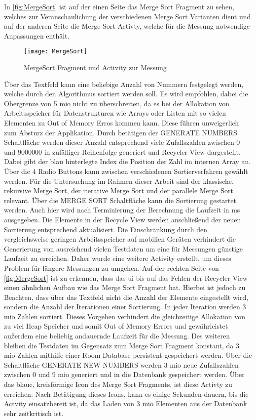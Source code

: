 In \autoref{fig:MergeSort} ist auf der einen Seite das Merge Sort Fragment zu sehen, welches zur Veranschaulichung der verschiedenen Merge Sort Varianten dient und auf der anderen Seite die Merge Sort Activty, welche für die Messung notwendige Anpassungen enthält. 
\begin{figure}[H]
\begin{center}
	\texttt{[image: MergeSort]}
	\caption{MergeSort Fragment und Activity zur Messung}
	\label{fig:MergeSort} 
\end{center}
\end{figure}
Über das Textfeld kann eine beliebige Anzahl von Nummern festgelegt werden, welche durch den Algorithmus sortiert werden soll. Es wird empfohlen, dabei die Obergrenze von 5 \ac{mio} nicht zu überschreiten, da es bei der Allokation von Arbeitsspeicher für Datenstrukturen wie Arrays oder Listen mit so vielen Elementen zu Out of Memory Erros kommen kann. Diese führen unweigerlich zum Absturz der Applikation. Durch betätigen der \glqq GENERATE NUMBERS\grqq{} Schaltfläche werden dieser Anzahl entsprechend viele Zufallszahlen zwischen 0 und 9000000 in zufälliger Reihenfolge generiert und Recycler View dargestellt. Dabei gibt der blau hinterlegte Index die Position der Zahl im internen Array an. Über die 4 Radio Buttons kann zwischen verschiedenen Sortierverfahren gewählt werden. Für die Untersuchung im Rahmen dieser Arbeit sind der klassische, rekursive Merge Sort, der iterative Merge Sort und der parallele Merge Sort relevant. Über die \glqq MERGE SORT\grqq{} Schaltfläche kann die Sortierung gestartet werden. Auch hier wird nach Terminierung der Berechnung die Laufzeit in \ac{ms} ausgegeben. Die Elemente in der Recycle View werden anschließend der neuen Sortierung entsprechend aktualisiert. Die Einschränkung durch den vergleichsweise geringen Arbeitsspeicher auf mobilien Geräten verhindert die Generierung von ausreichend vielen Testdaten um eine für Messungen günstige Laufzeit zu erreichen. Daher wurde eine weitere Activity erstellt, um dieses Problem für längere Messungen zu umgehen. Auf der rechten Seite von \autoref{fig:MergeSort} ist zu erkennen, dass das \ac{ui} bis auf das Fehlen der Recycler View einen ähnlichen Aufbau wie das Merge Sort Fragment hat. Hierbei ist jedoch zu Beachten, dass über das Textfeld nicht die Anzahl der Elemente eingestellt wird, sondern die Anzahl der Iterationen einer Sortierung. In jeder Iteration werden 3 \ac{mio} Zahlen sortiert. Dieses Vorgehen verhindert die gleichzeitige Allokation von zu viel Heap Speicher und somit Out of Memory Errors und gewährleistet außerdem eine beliebig andauernde Laufzeit für die Messung. Des weiteren bleiben die Testdaten im Gegensatz zum Merge Sort Fragment konstant, da 3 \ac{mio} Zahlen mithilfe einer Room Database persistent gespeichert werden. Über die Schaltfläche \glqq GENERATE NEW NUMBERS\grqq{} werden 3 \ac{mio} neue Zufallszahlen zwischen 0 und 9 \ac{mio} generiert und in die Datenbank gespeichert werden. Über das blaue, kreisförmige Icon des Merge Sort Fragments, ist diese Activty zu erreichen. Nach Betätigung dieses Icons, kann es einige Sekunden dauern, bis die Actvity einsatzbereit ist, da das Laden von 3 \ac{mio} Elementen aus der Datenbank sehr zeitkritisch ist.
